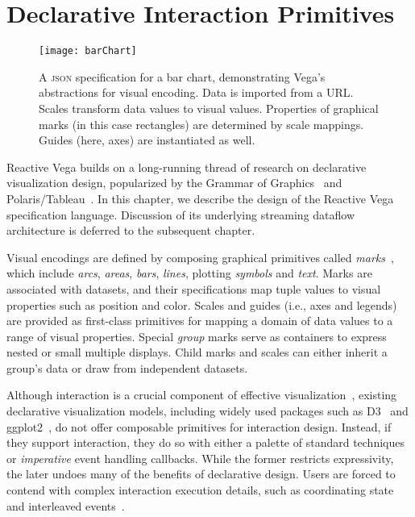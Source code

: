 \graphicspath{{./vega-lang/figures/}}
\chapter{Declarative Interaction Primitives}
\label{sec:vg:lang}

\vspace{-30pt}

\begin{figure}[b!]
  \centering
  \texttt{[image: barChart]}
  \caption{A \textsc{json} specification for a bar chart, demonstrating Vega's
  abstractions for visual encoding. Data is imported from a URL. Scales
  transform data values to visual values. Properties of graphical marks (in this
  case rectangles) are determined by scale mappings. Guides (here, axes) are
  instantiated as well.}
  \label{fig:vg:barChart}
\end{figure}

Reactive Vega builds on a long-running thread of research on declarative
visualization design, popularized by the Grammar of
Graphics~\cite{wilkinson:grammar} and Polaris/Tableau~\cite{stolte:polaris}. In
this chapter, we describe the design of the Reactive Vega specification
language. Discussion of its underlying streaming dataflow architecture is
deferred to the subsequent chapter.

Visual encodings are defined by composing graphical primitives called
\emph{marks}~\cite{bostock:protovis}, which include \emph{arcs}, \emph{areas},
\emph{bars}, \emph{lines}, plotting \emph{symbols} and \emph{text}. Marks are
associated with datasets, and their specifications map tuple values to visual
properties such as position and color. Scales and guides (i.e., axes and
legends) are provided as first-class primitives for mapping a domain of data
values to a range of visual properties. Special \emph{group} marks serve as
containers to express nested or small multiple displays. Child marks and scales
can either inherit a group's data or draw from independent datasets.

Although interaction is a crucial component of effective
visualization~\cite{liu:mentalmodels, pike:interactionscience}, existing
declarative visualization models, including widely used packages such as
D3~\cite{bostock:d3} and ggplot2~\cite{wickham:ggplot2}, do not offer composable
primitives for interaction design. Instead, if they support interaction, they do
so with either a palette of standard techniques~\cite{bostock:protovis,
bostock:d3} or \emph{imperative} event handling callbacks. While the former
restricts expressivity, the later undoes many of the benefits of declarative
design. Users are forced to contend with complex interaction execution details,
such as coordinating state and interleaved events~\cite{cooper:embedding,
edwards:coherent, myers:callbacks}.

